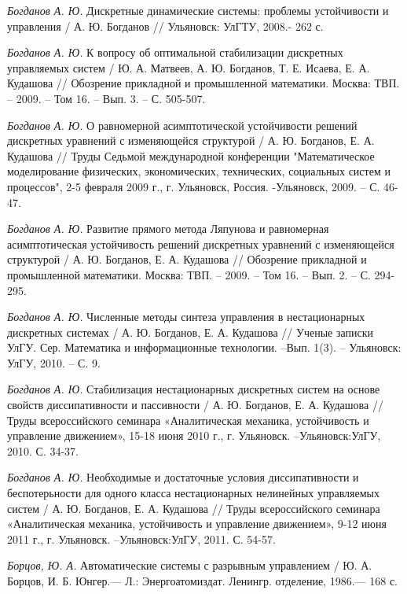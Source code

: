 \begin{thebibliography}{10}
	{\it Богданов А. Ю.} Дискретные динамические системы: проблемы устойчивости и управления / А. Ю. Богданов //
	Ульяновск: УлГТУ, 2008.- 262 с.
	
	{\it Богданов А. Ю.} К вопросу об оптимальной стабилизации дискретных управляемых систем / Ю. А. Матвеев, А. Ю. Богданов, Т. Е. Исаева, Е. А. Кудашова  //
	Обозрение прикладной и промышленной математики.  Москва: ТВП. – 2009. – Том 16. – Вып. 3. – С. 505-507.
	
	{\it Богданов А. Ю.} О равномерной асимптотической устойчивости решений дискретных уравнений с изменяющейся структурой / А. Ю. Богданов, Е. А. Кудашова //
	Труды Седьмой международной конференции "Математическое моделирование физических, экономических, технических, социальных систем и процессов", 2-5 февраля 2009 г., г. Ульяновск, Россия. -Ульяновск, 2009. – С. 46-47.
	
	{\it Богданов А. Ю.} Развитие прямого метода Ляпунова и равномерная асимптотическая устойчивость решений дискретных уравнений с изменяющейся структурой / А. Ю. Богданов, Е. А. Кудашова //
	Обозрение прикладной и промышленной математики.  Москва: ТВП. – 2009. – Том 16. – Вып. 2. – С. 294-295.
	
	{\it Богданов А. Ю.} Численные методы синтеза управления в нестационарных дискретных системах / А. Ю. Богданов, Е. А. Кудашова //
	Ученые записки УлГУ. Сер. Математика и информационные технологии. –Вып. 1(3). – Ульяновск: УлГУ, 2010. – С. 9.
	
	{\it Богданов А. Ю.} Стабилизация нестационарных дискретных систем на основе свойств диссипативности и пассивности / А. Ю. Богданов, Е. А. Кудашова //
	Труды всероссийского семинара «Аналитическая механика, устойчивость и управление движением», 15-18 июня 2010 г., г. Ульяновск. –Ульяновск:УлГУ, 2010. С. 34-37.
	
	{\it Богданов А. Ю.} Необходимые и достаточные условия диссипативности и беспотерьности для одного класса нестационарных нелинейных управляемых систем / А. Ю. Богданов, Е. А. Кудашова //
	Труды всероссийского семинара «Аналитическая механика, устойчивость и управление движением», 9-12 июня 2011 г., г. Ульяновск. –Ульяновск:УлГУ, 2011. С. 54-57.
	
	
	{\it Борцов, Ю. А.} Автоматические системы с разрывным управлением / Ю. А. Борцов,
	И. Б. Юнгер.— Л.: Энергоатомиздат. Ленингр. отделение, 1986.— 168 с.
	

\end{thebibliography}
